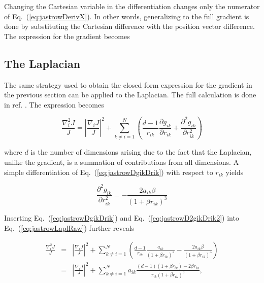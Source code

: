 Changing the Cartesian variable in the differentiation changes only the numerator of Eq.~(\ref{eq:jastrowDerivX}). In other words, generalizing to the full gradient is done by substituting the Cartesian difference with the position vector difference. The expression for the gradient becomes



\subsection{The Laplacian}

The same strategy used to obtain the closed form expression for the gradient in the previous section can be applied to the Laplacian. The full calculation is done in ref. \cite{morten}. The expression becomes

\begin{equation}
\label{eq:jastrowLaplRaw}
 \frac{\nabla^2_i J}{J} = \left| \frac{\nabla_i J}{J}\right|^2 + \sum_{k \ne i = 1}^N \left(\frac{d-1}{r_{ik}}\frac{\partial g_{ik}}{\partial r_{ik}} + \frac{\partial^2 g_{ik}}{\partial r_{ik}^2}\right) 
\end{equation}

where $d$ is the number of dimensions arising due to the fact that the Laplacian, unlike the gradient, is a summation of contributions from all dimensions. A simple differentiation of Eq.~(\ref{eq:jastrowDgikDrik}) with respect to $r_{ik}$ yields

\begin{equation}
\label{eq:jastrowD2gikDrik2}
 \frac{\partial^2 g_{ik}}{\partial r_{ik}^2} = -\frac{2a_{ik}\beta}{(1 + \beta r_{ik})^3}
\end{equation}

Inserting Eq.~(\ref{eq:jastrowDgikDrik}) and Eq.~(\ref{eq:jastrowD2gikDrik2}) into Eq.~(\ref{eq:jastrowLaplRaw}) further reveals

\begin{eqnarray}
 \frac{\nabla^2_i J}{J} &=& \left| \frac{\nabla_i J}{J}\right|^2 + \sum_{k \ne i = 1}^N \left(\frac{d-1}{r_{ik}}\frac{a_{ik}}{(1 + \beta r_{ik})^2} - \frac{2a_{ik}\beta}{(1 + \beta r_{ik})^3}\right) \nonumber\\
  &=& \left| \frac{\nabla_i J}{J}\right|^2 + \sum_{k \ne i = 1}^N a_{ik}\frac{(d-1)(1 + \beta r_{ik}) - 2\beta r_{ik}}{r_{ik}(1 + \beta r_{ik})^3}, \nonumber
\end{eqnarray}


